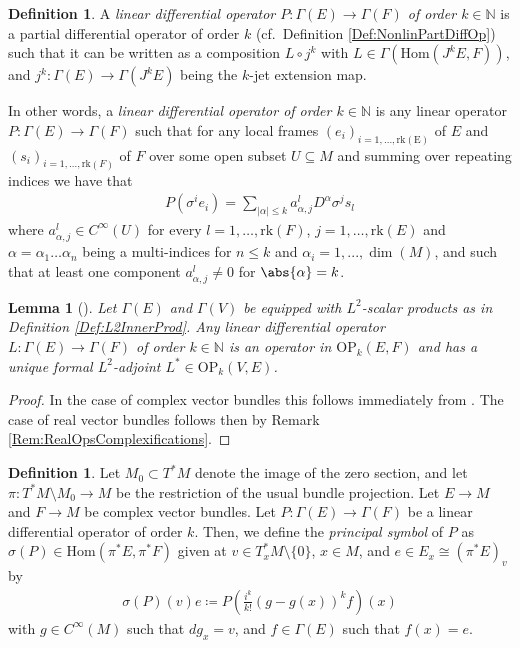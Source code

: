 \documentclass[12pt,a4paper]{article}
\theoremstyle{plain}
\newtheorem{lemma}[theorem]{Lemma}
\theoremstyle{definition}
\newtheorem{definition}[theorem]{Definition}
\newcommand{\N}{\mathbb{N}}
\newcommand{\OP}{\mathrm{OP}}
\begin{document}
\begin{definition}
A \textit{linear differential operator $P:\Gamma(E)\to \Gamma(F)$ of order $k\in \N$} is a partial differential operator of order $k$ (cf.~Definition \ref{Def:NonlinPartDiffOp}) such that it can be written as a composition $L\circ j^k$ with $L\in \Gamma(\mathrm{Hom}(J^kE,F))$, and $j^k:\Gamma(E)\to \Gamma(J^kE)$ being the $k$-jet extension map.

In other words, a \textit{linear differential operator of order $k\in \N$} is any linear operator $P:\Gamma(E)\to \Gamma(F)$ such that for any local frames $(e_i)_{i=1,\ldots,\mathrm{rk(E)}}$ of $E$ and $(s_i)_{i=1,\ldots,\mathrm{rk}(F)}$ of $F$ over some open subset $U\subseteq M$ and summing over repeating indices we have that 
\begin{align*}
    P(\sigma^ie_i)=\sum_{|\alpha|\leq k} a_{\alpha,j}^{l}D^\alpha \sigma^js_l
\end{align*}
where $a_{\alpha,j}^l\in C^\infty(U)$ for every $l=1,\ldots,\mathrm{rk}(F)$, $j=1,\ldots,\mathrm{rk}(E)$ and $\alpha=\alpha_1\ldots \alpha_n$ being a multi-indices for $n\leq k$ and $\alpha_i=1,...,\dim(M)$, and such that at least one component $a^l_{\alpha,j}\neq 0$ for $\abs{\alpha}=k$.
\end{definition}


\begin{lemma}[{\cite[§4, Proposition 2.1 and Proposition 2.2 and ]{Wells07}}]
\label{Lemma:DiffOpsInOP}
Let $\Gamma(E)$ and $\Gamma(V)$ be equipped with $L^2$-scalar products as in Definition \ref{Def:L2InnerProd}.
Any linear differential operator $L:\Gamma(E)\to \Gamma(F)$ of order $k\in \N$ is an operator in $\mathrm{OP}_k(E,F)$ and has a unique formal $L^2$-adjoint $L^*\in \OP_k(V,E)$.
\end{lemma}
\begin{proof}
In the case of complex vector bundles this follows immediately from \cite[§4, Proposition 2.2]{Wells07}. The case of real vector bundles follows then by Remark \ref{Rem:RealOpsComplexifications}.
\end{proof}


\begin{definition}
Let $M_0\subset T^*M$ denote the image of the zero section, and let $\pi:T^*M\setminus M_0\to M$ be the restriction of the usual bundle projection. Let $E\to M$ and $F\to M$ be complex vector bundles. Let $P:\Gamma(E)\to \Gamma(F)$ be a linear differential operator of order $k$. Then, we define the \textit{principal symbol} of $P$ as $\sigma(P)\in \mathrm{Hom}(\pi^*E,\pi^*F)$ given at $v\in T^*_xM\setminus \{0\}$, $x\in M$, and $e\in E_x\cong (\pi^*E)_v$ by 
\begin{align*}
    \sigma(P)(v)e\coloneqq P\left(\frac{i^k}{k!}(g-g(x))^kf\right)(x)
\end{align*}
with $g\in C^\infty(M)$ such that $dg_x=v$, and $f\in \Gamma(E)$ such that $f(x)=e$.
\end{definition}
\end{document}
